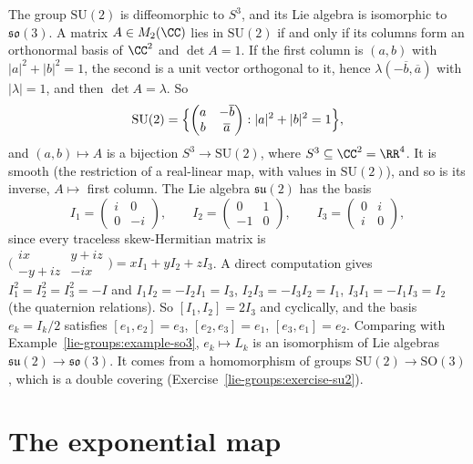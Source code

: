 \begin{example}\label{lie-groups:example-su2}
The group $\mathrm{SU}(2)$ is diffeomorphic to $S^3$, and its Lie algebra is isomorphic to $\mathfrak{so}(3)$. A matrix $A \in M_2(\CC)$ lies in
$\mathrm{SU}(2)$ if and only if its columns form an orthonormal basis of $\CC^2$ and $\det A = 1$. If the first column is $(a, b)$ with $|a|^2 + |b|^2 = 1$,
the second is a unit vector orthogonal to it, hence $\lambda(-\overline{b}, \overline{a})$ with $|\lambda| = 1$, and then $\det A = \lambda$. So
\[
\mathrm{SU}(2) = \Bigl\{\begin{pmatrix} a & -\overline{b}\\ b & \overline{a}\end{pmatrix} : |a|^2 + |b|^2 = 1\Bigr\},
\]
and $(a, b) \mapsto A$ is a bijection $S^3 \to \mathrm{SU}(2)$, where $S^3 \subseteq \CC^2 = \RR^4$. It is smooth (the restriction of a real-linear map, with
values in $\mathrm{SU}(2)$), and so is its inverse, $A \mapsto$ first column. The Lie algebra $\mathfrak{su}(2)$ has the basis
\[
I_1 = \begin{pmatrix} i & 0\\ 0 & -i\end{pmatrix}, \qquad I_2 = \begin{pmatrix} 0 & 1\\ -1 & 0\end{pmatrix}, \qquad I_3 = \begin{pmatrix} 0 & i\\ i & 0\end{pmatrix},
\]
since every traceless skew-Hermitian matrix is $\bigl(\begin{smallmatrix} ix & y + iz\\ -y + iz & -ix\end{smallmatrix}\bigr) = xI_1 + yI_2 + zI_3$. A direct
computation gives $I_1^2 = I_2^2 = I_3^2 = -I$ and $I_1I_2 = -I_2I_1 = I_3$, $I_2I_3 = -I_3I_2 = I_1$, $I_3I_1 = -I_1I_3 = I_2$ (the quaternion relations). So
$[I_1, I_2] = 2I_3$ and cyclically, and the basis $e_k = I_k/2$ satisfies $[e_1, e_2] = e_3$, $[e_2, e_3] = e_1$, $[e_3, e_1] = e_2$. Comparing with
Example~\ref{lie-groups:example-so3}, $e_k \mapsto L_k$ is an isomorphism of Lie algebras $\mathfrak{su}(2) \to \mathfrak{so}(3)$. It comes from a
homomorphism of groups $\mathrm{SU}(2) \to \mathrm{SO}(3)$, which is a double covering (Exercise~\ref{lie-groups:exercise-su2}).
\end{example}

\section{The exponential map}\label{lie-groups:section-exponential}

